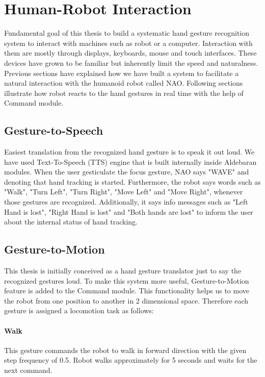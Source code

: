 \section{Human-Robot Interaction} Fundamental goal of this thesis to build a systematic hand gesture recognition system to interact with machines such as robot or a computer. Interaction with them are mostly through displays, keyboards, mouse and touch interfaces. These devices have grown to be familiar but inherently limit the speed and naturalness. Previous sections have explained how we have built a system to facilitate a natural interaction with the humanoid robot called NAO. Following sections illustrate how robot reacts to the hand gestures in real time with the help of Command module.

\subsection{Gesture-to-Speech} Easiest translation from the recognized hand gesture is to speak it out loud. We have used Text-To-Speech (TTS) engine that is built internally inside Aldebaran modules. When the user gesticulate the focus gesture, NAO says "WAVE" and denoting that hand tracking is started. Furthermore, the robot says words such as "Walk", "Turn Left", "Turn Right", "Move Left" and "Move Right", whenever those gestures are recognized. Additionally, it says info messages such as "Left Hand is lost", "Right Hand is lost" and "Both hands are lost" to inform the user about the internal status of hand tracking.

\subsection{Gesture-to-Motion} This thesis is initially conceived as a hand gesture translator just to say the recognized gestures loud. To make this system more useful, Gesture-to-Motion feature is added to the Command module. This functionality helps us to move the robot from one position to another in 2 dimensional space. Therefore each gesture is assigned a locomotion task as follows:

\paragraph*{Walk} This gesture commands the robot to walk in forward direction with the given step frequency of 0.5. Robot walks approximately for 5 seconds and waits for the next command.


